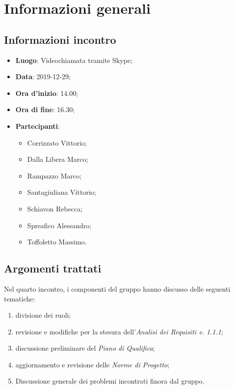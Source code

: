 \section{Informazioni generali}
    \subsection{Informazioni incontro}
        \begin{itemize}
            \item \textbf{Luogo}: Videochiamata tramite Skype;
            \item \textbf{Data}: 2019-12-29;
            \item \textbf{Ora d'inizio}: 14.00;
            \item \textbf{Ora di fine}: 16.30;
            \item \textbf{Partecipanti}: 
            \begin{itemize}
                \item Corrizzato Vittorio;
                \item Dalla Libera Marco;
                \item Rampazzo Marco;
                \item Santagiuliana Vittorio;
                \item Schiavon Rebecca;
                \item Spreafico Alessandro;
                \item Toffoletto Massimo.
            \end{itemize}
        \end{itemize}
    \subsection{Argomenti trattati}
        Nel quarto incontro, i componenti del gruppo hanno discusso delle seguenti tematiche:
        \begin{enumerate}
        	\item divisione dei ruoli;
        	\item revisione e modifiche per la stesura dell'\textit{Analisi dei Requisiti v. 1.1.1};
            \item discussione preliminare del \textit{Piano di Qualifica};
            \item aggiornamento e revisione delle \textit{Norme di Progetto};
            \item Discussione generale dei problemi incontrati finora dal gruppo.
        \end{enumerate}
